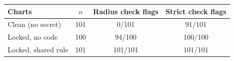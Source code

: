 \begin{tabular}{lccc}
\toprule
Charts & $n$ & Radius check flags & Strict check flags \\
\midrule
Clean (no secret) & 101 & 0/101 & 91/101 \\
Locked, no code & 100 & 94/100 & 100/100 \\
Locked, shared rule & 101 & 101/101 & 101/101 \\
\bottomrule
\end{tabular}
